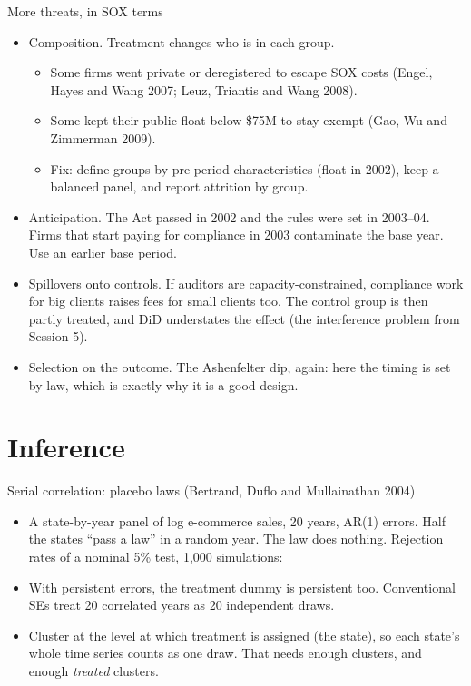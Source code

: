 \documentclass[aspectratio=169,11pt]{beamer}
\begin{document}
\begin{frame}{More threats, in SOX terms}
\small
\begin{itemize}
	\item \alert{Composition.} Treatment changes who is in each group.
	\begin{itemize}
		\item Some firms went private or deregistered to escape SOX costs (Engel, Hayes and Wang 2007;
		Leuz, Triantis and Wang 2008).
		\item Some kept their public float below \$75M to stay exempt (Gao, Wu and Zimmerman 2009).
		\item Fix: define groups by pre-period characteristics (float in 2002), keep a balanced panel, and report
		attrition by group.
	\end{itemize}
	\item \alert{Anticipation.} The Act passed in 2002 and the rules were set in 2003--04. Firms that start paying
	for compliance in 2003 contaminate the base year. Use an earlier base period.
	\item \alert{Spillovers onto controls.} If auditors are capacity-constrained, compliance work for big clients
	raises fees for small clients too. The control group is then partly treated, and DiD understates the effect
	(the interference problem from Session 5).
	\item \alert{Selection on the outcome.} The Ashenfelter dip, again: here the timing is set by law, which is
	exactly why it is a good design.
\end{itemize}
\end{frame}


\section{Inference}

\begin{frame}{Serial correlation: placebo laws (Bertrand, Duflo and Mullainathan 2004)}
\begin{itemize}
	\item A state-by-year panel of log e-commerce sales, 20 years, AR(1) errors. Half the states ``pass a law'' in a
	random year. The law does nothing. Rejection rates of a nominal 5\% test, 1,000 simulations:
\end{itemize}
\begin{center}
\small

\end{center}
\begin{itemize}
	\item With persistent errors, the treatment dummy is persistent too. Conventional SEs treat 20 correlated
	years as 20 independent draws.
	\item \alert{Cluster at the level at which treatment is assigned} (the state), so each state's whole time
	series counts as one draw. That needs enough clusters, and enough \emph{treated} clusters.
\end{itemize}
\end{frame}
\end{document}
